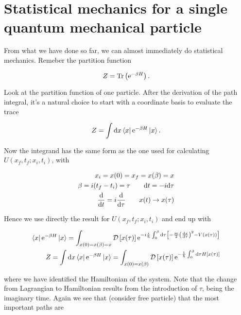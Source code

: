 \section[Statistical mechanics]{Statistical mechanics for a single quantum mechanical particle}

From what we have done so far, we can almost immediately do statistical mechanics. Remeber the partition function 

\begin{equation*}
    Z = \Tr \left( \mathrm{e}^{-\beta H} \right). 
\end{equation*}

Look at the partition function of one particle. After the derivation of the path integral, it's a natural choice to start with a coordinate basis to evaluate the trace

\begin{equation*}
    Z = \int \dd x \bra{x} \mathrm{e}^{-\beta H} \ket{x}. 
\end{equation*}

Now the integrand has the same form as the one used for calculating $U(x_{f}, t_{f} ; x_{i}, t_{i})$, with 

\begin{align*}
    x_{i} = x(0) = x_{f} = x(\beta) = x \\ 
    \beta = i(t_{f} - t_{i}) = \tau \quad \quad \dd t = -i \dd \tau \\ 
    \dv{}{t} = i \dv{}{\tau} \quad \quad x(t) \to x(\tau) 
\end{align*}

Hence we use directly the result for $U(x_{f}, t_{f} ; x_{i}, t_{i})$ and end up with

\begin{align}
    \bra{x} \mathrm{e}^{-\beta H} \ket{x} = \int_{x(0) = x(\beta) = x} \mathcal{D} \left[x(\tau)\right]\mathrm{e}^{-i \frac{i}{\hbar} \int_{0}^{\beta} \dd \tau \left[ -\frac{m}{2}\left(\dv{x}{\tau}\right)^{2} - V(x(\tau)) \right]} \nonumber \\ 
    Z = \int \dd x \bra{x} \mathrm{e}^{-\beta H} \ket{x} = \int_{x(0) = x(\beta)} \mathcal{D} \left[x(\tau)\right] \mathrm{e}^{-\frac{1}{\hbar}\int_{0}^{\beta} \dd \tau H\left[x(\tau)\right]}
\end{align}

where we have identified the Hamiltonian of the system. Note that the change from Lagrangian to Hamiltonian results from the introduction of $\tau$, being the imaginary time. Again we see that (consider free particle) that the most important paths are 

